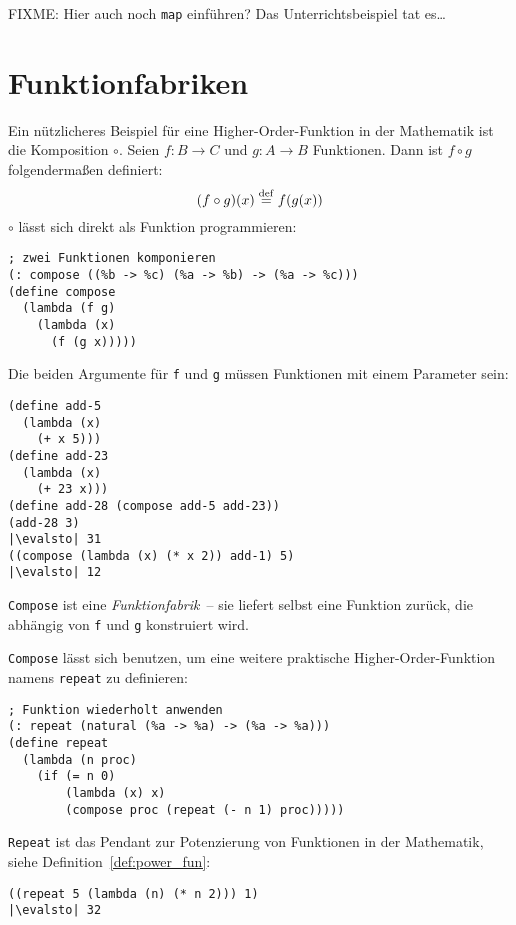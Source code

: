 FIXME: Hier auch noch \texttt{map} einführen? Das Unterrichtsbeispiel tat
es\ldots

\section{Funktionfabriken}

Ein nützlicheres Beispiel für eine Higher-Order-Funktion in der
Mathematik ist die
Komposition
$\circ$.  Seien $f: B\rightarrow C$ und $g: A\rightarrow B$
Funktionen.  Dann ist $f\circ g$ folgendermaßen definiert:
%
\begin{displaymath}
  (f \circ g)(x) \stackrel{\rm def}{=}{} f(g(x))
\end{displaymath}
%
$\circ$ lässt sich direkt als Funktion
programmieren:
\label{page:compose}
%
\begin{lstlisting}
; zwei Funktionen komponieren
(: compose ((%b -> %c) (%a -> %b) -> (%a -> %c)))
(define compose
  (lambda (f g)
    (lambda (x)
      (f (g x)))))
\end{lstlisting}
%
Die beiden Argumente für \texttt{f} und \texttt{g} müssen Funktionen
mit einem Parameter sein:
%
\begin{lstlisting}
(define add-5
  (lambda (x)
    (+ x 5)))
(define add-23
  (lambda (x)
    (+ 23 x)))
(define add-28 (compose add-5 add-23))
(add-28 3)
|\evalsto| 31
((compose (lambda (x) (* x 2)) add-1) 5)
|\evalsto| 12
\end{lstlisting}
%
\texttt{Compose} ist eine
\textit{Funktionfabrik}~-- sie liefert selbst
eine Funktion zurück, die abhängig von \texttt{f} und \texttt{g}
konstruiert wird.

\texttt{Compose} lässt sich benutzen, um eine weitere praktische
Higher-Order-Funktion namens
\texttt{repeat} zu definieren:
\label{page:repeat}
%
\begin{lstlisting}
; Funktion wiederholt anwenden
(: repeat (natural (%a -> %a) -> (%a -> %a)))
(define repeat
  (lambda (n proc)
    (if (= n 0)
        (lambda (x) x)
        (compose proc (repeat (- n 1) proc)))))
\end{lstlisting}
%
\texttt{Repeat} ist das Pendant zur Potenzierung von
Funktionen in der Mathematik, siehe Definition~\ref{def:power_fun}:
%
\begin{lstlisting}
((repeat 5 (lambda (n) (* n 2))) 1)
|\evalsto| 32
\end{lstlisting}

